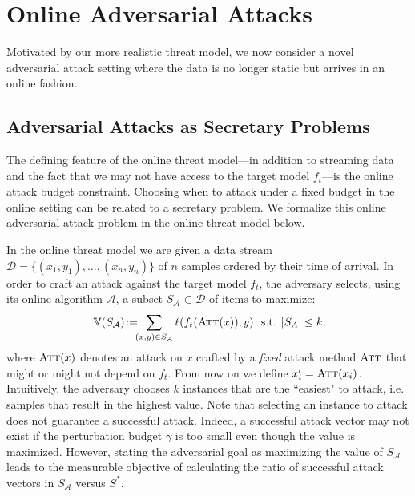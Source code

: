 \section{Online Adversarial Attacks}
\label{online_adversarial_attacks}
Motivated by our more realistic threat model, we now consider a novel adversarial attack setting where the data is no longer static but arrives in an online fashion.

\subsection{Adversarial Attacks as Secretary Problems}
\label{adv_sec_problem}
The defining feature of the online threat model---in addition to streaming data and the fact that we may not have access to the target model $f_t$---is the online attack budget constraint.
Choosing when to attack under a fixed budget in the online setting can be related to a secretary problem. We formalize this online adversarial attack problem in the online threat model below.

In the online threat model we are given a data stream $\mathcal{D}=\{(x_1,y_1),\ldots,(x_n,y_n)\}$ of $n$ samples ordered by their time of arrival. In order to craft an attack against the target model $f_t$, the adversary selects, using its online algorithm $\mathcal{A}$, a subset $S_{\mathcal{A}} \subset \mathcal{D}$ of items to maximize: %
\begin{equation}\label{eq:asp}
   \mathbb{V}(S_\mathcal{A}) \! := \!\!\! \sum_{ (x,y) \in S_\mathcal{A}} \ell(f_{t}(\textsc{Att}(x)),y) \ \text{ s.t. } 
   |S_A| \leq k,\hspace{-1mm} 
\end{equation}
where $\textsc{Att}(x)$ denotes an attack on $x$ crafted by a \emph{fixed} attack method $\textsc{Att}$ that might or might not depend on $f_t$. From now on we define $x_i'=\textsc{Att}(x_i)$. 
Intuitively, the adversary chooses $k$ instances that are the ``easiest" to attack, i.e. samples that result in the highest value. Note that selecting an instance to attack does not guarantee a successful attack.
Indeed, a successful attack vector may not exist if the perturbation budget $\gamma$ is too small even though the value is maximized. However, stating the adversarial goal as maximizing the value of $S_{\mathcal{A}}$ leads to the measurable objective of calculating the ratio of successful attack vectors in $S_{\mathcal{A}}$ versus $S^*$.

